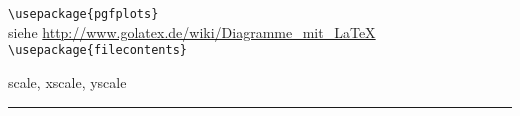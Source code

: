 

\lstinline|\usepackage{pgfplots}|\\
siehe \url{http://www.golatex.de/wiki/Diagramme_mit_LaTeX}\\

\noindent
\lstinline|\usepackage{filecontents}|

scale, xscale, yscale


\hrule \vspace{0.5\baselineskip}
